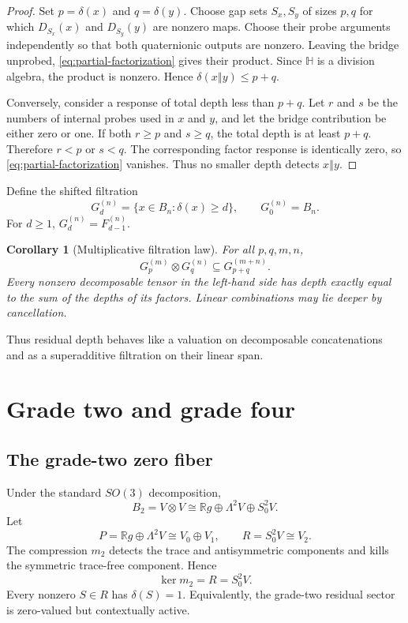 \documentclass[11pt]{article}
\newtheorem{corollary}[theorem]{Corollary}
\theoremstyle{definition}
\theoremstyle{remark}
\newcommand{\R}{\mathbb R}
\newcommand{\Hq}{\mathbb H}
\newcommand{\depth}{\delta}
\newcommand{\concat}{\mathbin{\Vert}}
\begin{document}
\begin{proof}
Set $p=\depth(x)$ and $q=\depth(y)$.  Choose gap sets $S_x,S_y$ of sizes $p,q$ for which $D_{S_x}(x)$ and $D_{S_y}(y)$ are nonzero maps.  Choose their probe arguments independently so that both quaternionic outputs are nonzero.  Leaving the bridge unprobed, \eqref{eq:partial-factorization} gives their product.  Since $\Hq$ is a division algebra, the product is nonzero.  Hence $\depth(x\concat y)\le p+q$.

Conversely, consider a response of total depth less than $p+q$.  Let $r$ and $s$ be the numbers of internal probes used in $x$ and $y$, and let the bridge contribution be either zero or one.  If both $r\ge p$ and $s\ge q$, the total depth is at least $p+q$.  Therefore $r<p$ or $s<q$.  The corresponding factor response is identically zero, so \eqref{eq:partial-factorization} vanishes.  Thus no smaller depth detects $x\concat y$.
\end{proof}

Define the shifted filtration
\[
  G_d^{(n)}=\{x\in B_n:\depth(x)\ge d\},
  \qquad G_0^{(n)}=B_n.
\]
For $d\ge1$, $G_d^{(n)}=F_{d-1}^{(n)}$.

\begin{corollary}[Multiplicative filtration law]\label{cor:multiplicative-filtration}
For all $p,q,m,n$,
\[
  G_p^{(m)}\otimes G_q^{(n)}
  \subseteq G_{p+q}^{(m+n)}.
\]
Every nonzero decomposable tensor in the left-hand side has depth exactly equal to the sum of the depths of its factors.  Linear combinations may lie deeper by cancellation.
\end{corollary}

Thus residual depth behaves like a valuation on decomposable concatenations and as a superadditive filtration on their linear span.

\section{Grade two and grade four}\label{sec:grade-four}

\subsection{The grade-two zero fiber}

Under the standard $SO(3)$ decomposition,
\begin{equation}\label{eq:b2-decomp}
  B_2=V\otimes V
  \cong \R g\oplus\Lambda^2V\oplus S^2_0V.
\end{equation}
Let
\[
  P=\R g\oplus\Lambda^2V\cong V_0\oplus V_1,
  \qquad
  R=S^2_0V\cong V_2.
\]
The compression $m_2$ detects the trace and antisymmetric components and kills the symmetric trace-free component.  Hence
\begin{equation}\label{eq:grade-two-kernel}
  \ker m_2=R=S^2_0V.
\end{equation}
Every nonzero $S\in R$ has $\depth(S)=1$.  Equivalently, the grade-two residual sector is zero-valued but contextually active.
\end{document}
